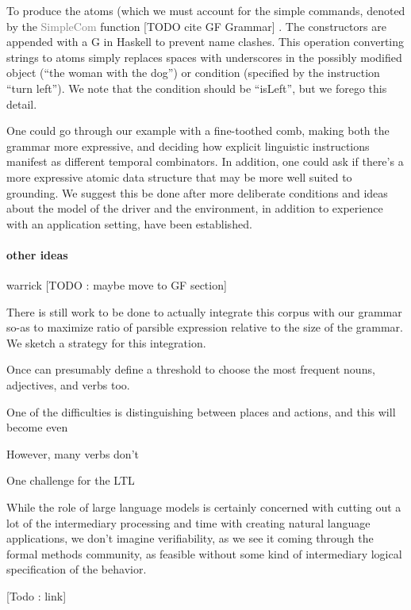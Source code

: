 \documentclass[a4paper, 11pt]{article}
\newcommand{\gray}[1]{\textcolor{gray}{#1}}
\begin{document}
To produce the atoms (which we must account for the simple commands, denoted by
the \gray{SimpleCom} function [TODO cite GF Grammar] . The constructors are
appended with a G in Haskell to prevent name clashes. This operation converting
strings to atoms simply replaces spaces with underscores in the possibly
modified object (``the woman with the dog'') or condition (specified by the
instruction ``turn left''). We note that the condition should be ``isLeft'',
but we forego this detail.

One could go through our example with a fine-toothed comb, making both the
grammar more expressive, and deciding how explicit linguistic instructions
manifest as different temporal combinators. In addition, one could ask if there's
a more expressive atomic data structure that may be more well suited to
grounding. We suggest this be done after more deliberate conditions and ideas
about the model of the driver and the environment, in addition to experience
with an application setting, have been established.

\paragraph{other ideas}


warrick
[TODO : maybe move to GF section]


There is still work to be done to actually integrate this corpus with our
grammar so-as to maximize ratio of parsible expression relative to the size of the
grammar. We sketch a strategy for this integration.

Once can presumably define a
threshold to choose the most frequent nouns, adjectives, and verbs too.

One of the difficulties is distinguishing between places and actions, and this
will become even 

However,
many verbs don't 

One challenge for the LTL 


While the role of large language models is certainly concerned with cutting out
a lot of the intermediary processing and time with creating natural language
applications, we don't imagine verifiability, as we see it coming through the
formal methods community, as feasible without some kind of intermediary logical
specification of the behavior. 




[Todo : link]
\end{document}

